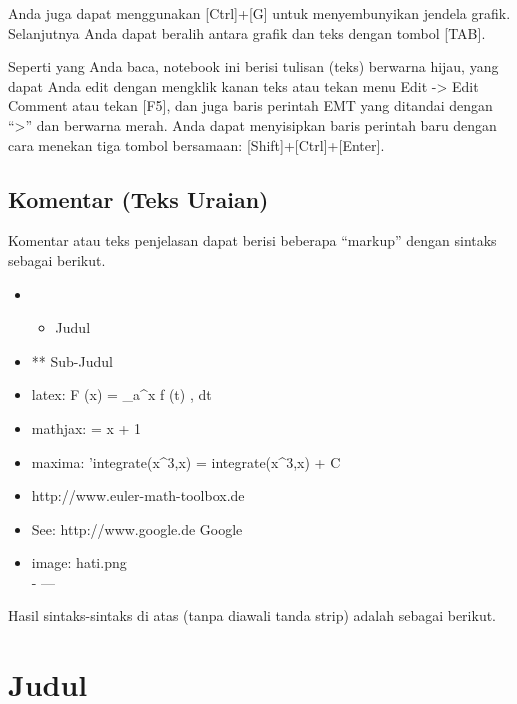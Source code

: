 \documentclass[
]{book}
\providecommand{\tightlist}{%
  \setlength{\itemsep}{0pt}\setlength{\parskip}{0pt}}
\begin{document}
Anda juga dapat menggunakan {[}Ctrl{]}+{[}G{]} untuk menyembunyikan jendela grafik. Selanjutnya Anda dapat beralih antara grafik dan teks dengan tombol {[}TAB{]}.

Seperti yang Anda baca, notebook ini berisi tulisan (teks) berwarna hijau, yang dapat Anda edit dengan mengklik kanan teks atau tekan menu Edit -\textgreater{} Edit Comment atau tekan {[}F5{]}, dan juga baris perintah EMT yang ditandai dengan ``\textgreater{}'' dan berwarna merah. Anda dapat menyisipkan baris perintah baru dengan cara menekan tiga tombol bersamaan: {[}Shift{]}+{[}Ctrl{]}+{[}Enter{]}.

\section{Komentar (Teks Uraian)}\label{komentar-teks-uraian}

Komentar atau teks penjelasan dapat berisi beberapa ``markup'' dengan sintaks sebagai berikut.

\begin{itemize}
\tightlist
\item
  \begin{itemize}
  \tightlist
  \item
    Judul\\
  \end{itemize}
\item
  ** Sub-Judul\\
\item
  latex: F (x) = \int\_a\^{}x f (t) , dt\\
\item
  mathjax:  = x + 1\\
\item
  maxima: 'integrate(x\^{}3,x) = integrate(x\^{}3,x) + C\\
\item
  http://www.euler-math-toolbox.de\\
\item
  See: http://www.google.de \textbar{} Google\\
\item
  image: hati.png\\
  - ---
\end{itemize}

Hasil sintaks-sintaks di atas (tanpa diawali tanda strip) adalah sebagai berikut.

\chapter{Judul}\label{judul}
\end{document}
